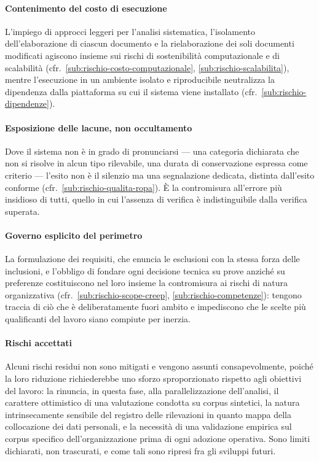\paragraph*{Contenimento del costo di esecuzione} L'impiego di approcci leggeri per l'analisi sistematica, l'isolamento dell'elaborazione di ciascun documento e la rielaborazione dei soli documenti modificati agiscono insieme sui rischi di sostenibilità computazionale e di scalabilità (cfr.~\ref{sub:rischio-costo-computazionale}, \ref{sub:rischio-scalabilita}), mentre l'esecuzione in un ambiente isolato e riproducibile neutralizza la dipendenza dalla piattaforma su cui il sistema viene installato (cfr.~\ref{sub:rischio-dipendenze}).

\paragraph*{Esposizione delle lacune, non occultamento} Dove il sistema non è in grado di pronunciarsi --- una categoria dichiarata che non si risolve in alcun tipo rilevabile, una durata di conservazione espressa come criterio --- l'esito non è il silenzio ma una segnalazione dedicata, distinta dall'esito conforme (cfr.~\ref{sub:rischio-qualita-ropa}). È la contromisura all'errore più insidioso di tutti, quello in cui l'assenza di verifica è indistinguibile dalla verifica superata.

\paragraph*{Governo esplicito del perimetro} La formulazione dei requisiti, che enuncia le esclusioni con la stessa forza delle inclusioni, e l'obbligo di fondare ogni decisione tecnica su prove anziché su preferenze costituiscono nel loro insieme la contromisura ai rischi di natura organizzativa (cfr.~\ref{sub:rischio-scope-creep}, \ref{sub:rischio-competenze}): tengono traccia di ciò che è deliberatamente fuori ambito e impediscono che le scelte più qualificanti del lavoro siano compiute per inerzia.

\paragraph*{Rischi accettati} Alcuni rischi residui non sono mitigati e vengono assunti consapevolmente, poiché la loro riduzione richiederebbe uno sforzo sproporzionato rispetto agli obiettivi del lavoro: la rinuncia, in questa fase, alla parallelizzazione dell'analisi, il carattere ottimistico di una valutazione condotta su corpus sintetici, la natura intrinsecamente sensibile del registro delle rilevazioni in quanto mappa della collocazione dei dati personali, e la necessità di una validazione empirica sul corpus specifico dell'organizzazione prima di ogni adozione operativa. Sono limiti dichiarati, non trascurati, e come tali sono ripresi fra gli sviluppi futuri.